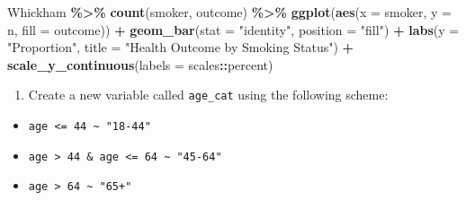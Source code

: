 \documentclass[
]{article}
\newenvironment{Shaded}{\begin{snugshade}}{\end{snugshade}}
\newcommand{\AttributeTok}[1]{\textcolor[rgb]{0.13,0.29,0.53}{#1}}
\newcommand{\DecValTok}[1]{\textcolor[rgb]{0.00,0.00,0.81}{#1}}
\newcommand{\FunctionTok}[1]{\textcolor[rgb]{0.13,0.29,0.53}{\textbf{#1}}}
\newcommand{\NormalTok}[1]{#1}
\newcommand{\OtherTok}[1]{\textcolor[rgb]{0.56,0.35,0.01}{#1}}
\newcommand{\SpecialCharTok}[1]{\textcolor[rgb]{0.81,0.36,0.00}{\textbf{#1}}}
\newcommand{\StringTok}[1]{\textcolor[rgb]{0.31,0.60,0.02}{#1}}
\providecommand{\tightlist}{%
  \setlength{\itemsep}{0pt}\setlength{\parskip}{0pt}}
\begin{document}
\begin{Shaded}
\begin{Highlighting}[]
\NormalTok{Whickham }\SpecialCharTok{\%\textgreater{}\%}
  \FunctionTok{count}\NormalTok{(smoker, outcome) }\SpecialCharTok{\%\textgreater{}\%}
  \FunctionTok{ggplot}\NormalTok{(}\FunctionTok{aes}\NormalTok{(}\AttributeTok{x =}\NormalTok{ smoker, }\AttributeTok{y =}\NormalTok{ n, }\AttributeTok{fill =}\NormalTok{ outcome)) }\SpecialCharTok{+}
  \FunctionTok{geom\_bar}\NormalTok{(}\AttributeTok{stat =} \StringTok{"identity"}\NormalTok{, }\AttributeTok{position =} \StringTok{"fill"}\NormalTok{) }\SpecialCharTok{+}
  \FunctionTok{labs}\NormalTok{(}\AttributeTok{y =} \StringTok{"Proportion"}\NormalTok{, }\AttributeTok{title =} \StringTok{"Health Outcome by Smoking Status"}\NormalTok{) }\SpecialCharTok{+}
  \FunctionTok{scale\_y\_continuous}\NormalTok{(}\AttributeTok{labels =}\NormalTok{ scales}\SpecialCharTok{::}\NormalTok{percent)}
\end{Highlighting}
\end{Shaded}

\begin{enumerate}
\def\labelenumi{\arabic{enumi}.}
\setcounter{enumi}{5}
\tightlist
\item
  Create a new variable called \texttt{age\_cat} using the following
  scheme:
\end{enumerate}

\begin{itemize}
\tightlist
\item
  \texttt{age\ \textless{}=\ 44\ \textasciitilde{}\ "18-44"}
\item
  \texttt{age\ \textgreater{}\ 44\ \&\ age\ \textless{}=\ 64\ \textasciitilde{}\ "45-64"}
\item
  \texttt{age\ \textgreater{}\ 64\ \textasciitilde{}\ "65+"}
\end{itemize}

\begin{Shaded}
\end{Shaded}
\end{document}
